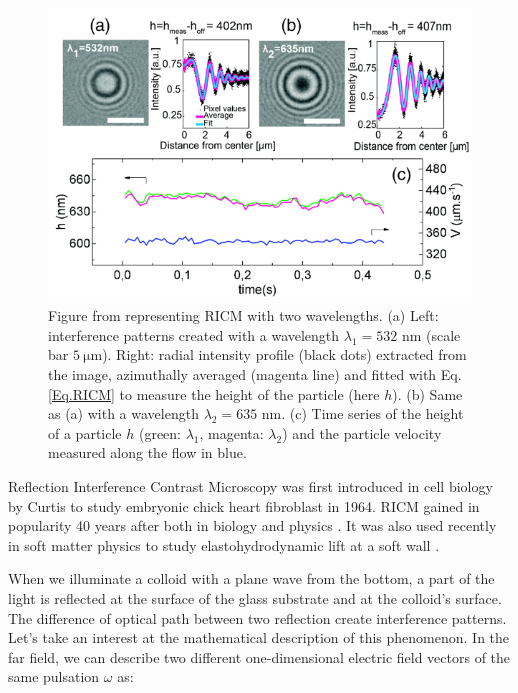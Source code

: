 \begin{figure}[h]
	\centering
	\includegraphics[scale=1]{02_body/chapter2/images/RICM.png}
	\caption{Figure from \cite{davies_elastohydrodynamic_2018} representing \gls{RICM} with two wavelengths. (a) Left: interference patterns created with a wavelength $\lambda_1 = 532$ nm (scale bar $ 5~\mathrm{\mu m}$). 
		Right: radial intensity profile (black dots) extracted from the image, azimuthally averaged (magenta line) and fitted with Eq.\ref{Eq.RICM} to measure the height of the particle (here $h$). (b) Same as (a) with a wavelength $\lambda_2 = 635$ nm. (c) Time series of the height of a particle $h$ (green: $ \lambda_1$, magenta: $\lambda_2$) and the particle velocity measured along the flow in blue. }
	\label{fig.RICM}
\end{figure}


Reflection Interference Contrast Microscopy was first introduced in cell biology by Curtis to study embryonic chick heart fibroblast \cite{curtis_mechanism_1964} in 1964. \gls{RICM} gained in popularity 40 years after both in biology and physics \cite{filler_reflection_2000, siver_use_2000, weber_2_2003, limozin_quantitative_2009, nadal_probing_2002, raedler_measurement_1992}. It was also used recently in soft matter physics to study elastohydrodynamic lift at a soft wall \cite{davies_elastohydrodynamic_2018}.

When we illuminate a colloid with a plane wave from the bottom, a part of the light is reflected at the surface of the glass substrate and at the colloid's surface. The difference of optical path between two reflection create interference patterns. Let's take an interest at the mathematical description of this phenomenon. In the far field, we can describe two different one-dimensional electric field vectors of the same pulsation $\omega$ \cite{f_bohren_absorption_1998} as:

